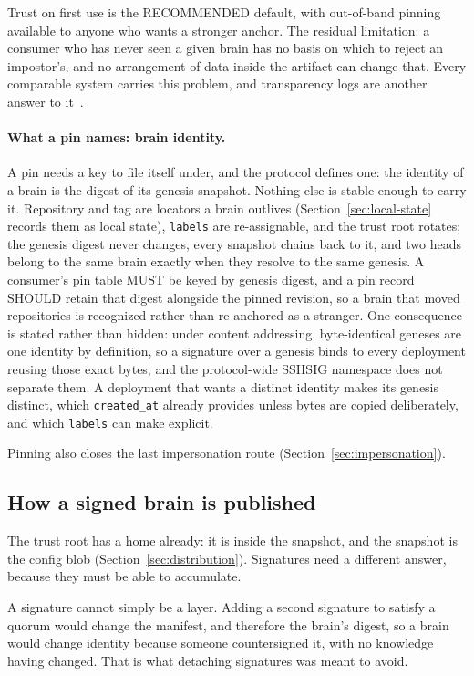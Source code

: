 \documentclass[11pt,a4paper]{article}
\begin{document}
Trust on first use is the RECOMMENDED default, with out-of-band pinning
available to anyone who wants a stronger anchor. The residual limitation: a
consumer who has never seen a given brain has no basis on which to reject an
impostor's, and no arrangement of data inside the artifact can change that.
Every comparable system carries this problem, and transparency logs are
another answer to it~\cite{rfc9162, newman2022sigstore}.

\paragraph{What a pin names: brain identity.}
A pin needs a key to file itself under, and the protocol defines one: the
identity of a brain is the digest of its genesis snapshot. Nothing else is
stable enough to carry it. Repository and tag are locators a brain outlives
(Section~\ref{sec:local-state} records them as local state), \texttt{labels}
are re-assignable, and the trust root rotates; the genesis digest never
changes, every snapshot chains back to it, and two heads belong to the same
brain exactly when they resolve to the same genesis. A consumer's pin table
MUST be keyed by genesis digest, and a pin record SHOULD retain that digest
alongside the pinned revision, so a brain that moved repositories is
recognized rather than re-anchored as a stranger. One consequence is stated
rather than hidden: under content addressing, byte-identical geneses are one
identity by definition, so a signature over a genesis binds to every
deployment reusing those exact bytes, and the protocol-wide SSHSIG namespace
does not separate them. A deployment that wants a distinct identity makes its
genesis distinct, which \texttt{created\_at} already provides unless bytes
are copied deliberately, and which \texttt{labels} can make explicit.

Pinning also closes the last impersonation route
(Section~\ref{sec:impersonation}).

\subsection{How a signed brain is published}
\label{sec:publish-signed}

The trust root has a home already: it is inside the snapshot, and the snapshot
is the config blob (Section~\ref{sec:distribution}). Signatures need a different
answer, because they must be able to accumulate.

A signature cannot simply be a layer. Adding a second signature to satisfy a
quorum would change the manifest, and therefore the brain's digest, so a brain
would change identity because someone countersigned it, with no knowledge having
changed. That is what detaching signatures was meant to avoid.
\end{document}
